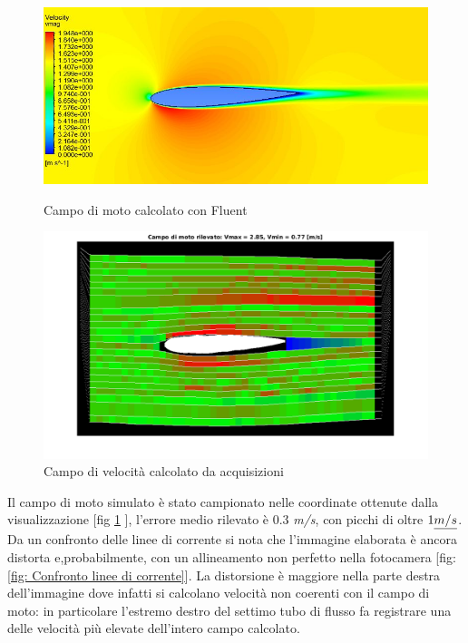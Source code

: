 \begin{figure}[H]
\centering
\includegraphics[scale=0.7]{Figure/CFD_wake.JPG}
\caption{Campo di moto calcolato con Fluent}
\label{fig: Campo di moto Fluent}

\centering
\includegraphics[scale=0.6]{Figure/v_field.png}
\caption{Campo di velocità calcolato da acquisizioni}
\label{fig: Campo di velocità calcolato}
\end{figure}

Il campo di moto simulato è stato campionato nelle coordinate ottenute dalla visualizzazione [fig \ref{fig: Campo di velocità calcolato} ], l'errore medio rilevato è 0.3 \emph{m/s}, con picchi di oltre $ 1 \emph{m/s}$. Da un confronto delle linee di corrente si nota che l'immagine elaborata è ancora distorta e,probabilmente, con un allineamento non perfetto nella fotocamera [fig: \ref{fig: Confronto linee di corrente}]. La distorsione è maggiore nella parte destra dell'immagine dove infatti si calcolano velocità non coerenti con il campo di moto: in particolare l'estremo destro del settimo tubo di flusso fa registrare una delle velocità più elevate dell'intero campo calcolato. 


